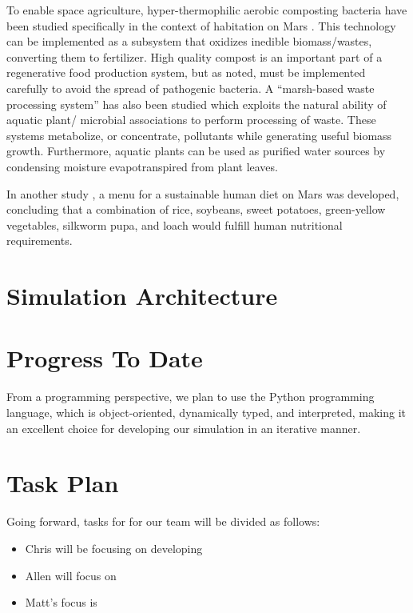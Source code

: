 \documentclass[12pt]{article}
\begin{document}
To enable space agriculture, hyper-thermophilic aerobic composting bacteria
have been studied specifically in the context of habitation on Mars
\cite{kanazawa2008space}. This technology can be implemented as a subsystem
that oxidizes inedible biomass/wastes, converting them to fertilizer. High
quality compost is an important part of a regenerative food production system,
but as noted, must be implemented carefully to avoid the spread of pathogenic
bacteria. A ``marsh-based waste processing system'' \cite{nelson1992biosphere}
has also been studied which exploits the natural ability of aquatic plant/
microbial associations to perform processing of waste. These systems metabolize,
or concentrate, pollutants while generating useful biomass growth. Furthermore,
aquatic plants can be used as purified water sources by condensing moisture
evapotranspired from plant leaves.

In another study \cite{katayama2005entomophagy}, a menu for a sustainable human
diet on Mars was developed, concluding that a combination of rice, soybeans,
sweet potatoes, green-yellow vegetables, silkworm pupa, and loach would fulfill
human nutritional requirements.

\section{Simulation Architecture}
\label{sec:architecture}

\section{Progress To Date}
\label{sec:progress}

From a programming perspective, we plan to use the Python programming language,
which is object-oriented, dynamically typed, and interpreted, making it an
excellent choice for developing our simulation in an iterative manner.

\section{Task Plan}
\label{sec:taskplan}

Going forward, tasks for for our team will be divided as follows:

\begin{itemize}
  \item Chris will be focusing on developing
  \item Allen will focus on
  \item Matt's focus is
\end{itemize}

\clearpage
{}

\end{document}
